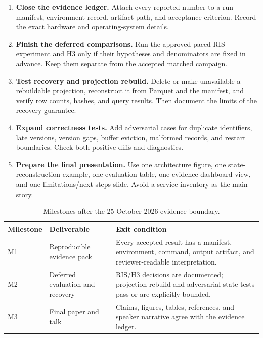 \documentclass[a4paper,11pt]{article}
\begin{document}
\begin{enumerate}
    \item \textbf{Close the evidence ledger.} Attach every reported number to a run manifest, environment record, artifact path, and acceptance criterion. Record the exact hardware and operating-system details.
    \item \textbf{Finish the deferred comparisons.} Run the approved paced RIS experiment and H3 only if their hypotheses and denominators are fixed in advance. Keep them separate from the accepted matched campaign.
    \item \textbf{Test recovery and projection rebuild.} Delete or make unavailable a rebuildable projection, reconstruct it from Parquet and the manifest, and verify row counts, hashes, and query results. Then document the limits of the recovery guarantee.
    \item \textbf{Expand correctness tests.} Add adversarial cases for duplicate identifiers, late versions, version gaps, buffer eviction, malformed records, and restart boundaries. Check both positive diffs and diagnostics.
    \item \textbf{Prepare the final presentation.} Use one architecture figure, one state-reconstruction example, one evaluation table, one evidence dashboard view, and one limitations/next-steps slide. Avoid a service inventory as the main story.
\end{enumerate}

\begin{table}[ht]
\centering
\caption{Milestones after the 25 October 2026 evidence boundary.}
\label{tab:roadmap}
\begin{tabularx}{\textwidth}{@{}p{}p{}X@{}}
\toprule
Milestone & Deliverable & Exit condition \\
\midrule
M1 & Reproducible evidence pack & Every accepted result has a manifest, environment, command, output artifact, and reviewer-readable interpretation. \\
M2 & Deferred evaluation and recovery & RIS/H3 decisions are documented; projection rebuild and adversarial state tests pass or are explicitly bounded. \\
M3 & Final paper and talk & Claims, figures, tables, references, and speaker narrative agree with the evidence ledger. \\
\bottomrule
\end{tabularx}
\end{table}

\clearpage
\end{document}
